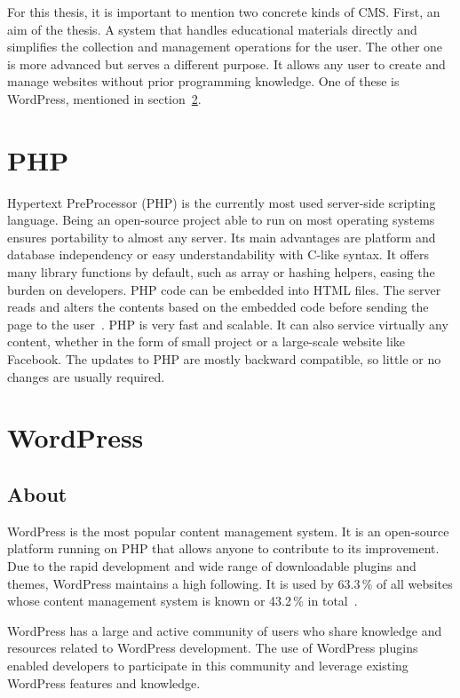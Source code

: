 \documentclass[
  digital,     %
  oneside,     %
  nosansbold,  %
  colorbold, %
  lof,         %
  lot,         %
]{fithesis4}
\begin{document}
For this thesis, it is important to mention two concrete kinds of CMS. First, an aim
of the thesis. A system that handles educational materials directly and simplifies
the collection and management operations for the user. The other one is more advanced
but serves a different purpose. It allows any user to create and manage websites
without prior programming knowledge. One of these is WordPress, mentioned in
section~\ref{sect:wordpress}.

\section{PHP}

Hypertext PreProcessor (PHP) is the currently most used \mbox{server-side} scripting
language. Being an \mbox{open-source} project able to run on most operating systems
ensures portability to almost any server. Its main advantages are platform and database
independency or easy understandability with \mbox{C-like} syntax. It offers many
library functions by default, such as array or hashing helpers, easing the burden
on developers. PHP code can be embedded into HTML files. The server reads and
alters the contents based on the embedded code before sending the page to the
user~\parencite[page.~30]{welling17}. PHP is very fast and scalable. It can also
service virtually any content, whether in the form of small project or
a \mbox{large-scale} website like Facebook. The updates to PHP are mostly backward
compatible, so little or no changes are usually required.

\section{WordPress}
\label{sect:wordpress}

\subsection{About}

WordPress is the most popular content management system. It is an \mbox{open-source}
platform running on PHP that allows anyone to contribute to its improvement.
Due to the rapid development and wide range of downloadable plugins and themes,
WordPress maintains a high following. It is used by 63.3\,\% of all websites whose
content management system is known or 43.2\,\% in total~\cite{w3_wordpress}.

WordPress has a large and active community of users who share knowledge and
resources related to WordPress development. The use of WordPress plugins
enabled developers to participate in this community and leverage existing
WordPress features and knowledge.
\end{document}
